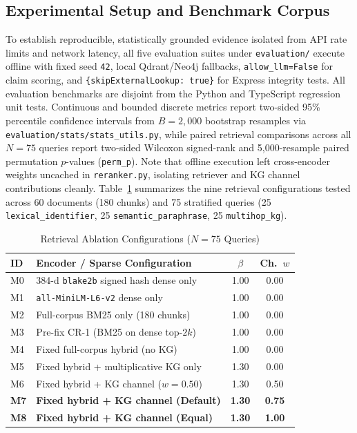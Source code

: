 \documentclass[conference]{IEEEtran}
\begin{document}
\subsection{Experimental Setup and Benchmark Corpus}
To establish reproducible, statistically grounded evidence isolated from API rate limits and network latency, all five evaluation suites under \texttt{evaluation/} execute offline with fixed seed \texttt{42}, local Qdrant/Neo4j fallbacks, \texttt{allow\_llm=False} for claim scoring, and \texttt{\{skipExternalLookup: true\}} for Express integrity tests. All evaluation benchmarks are disjoint from the Python and TypeScript regression unit tests. Continuous and bounded discrete metrics report two-sided 95\% percentile confidence intervals from $B{=}2{,}000$ bootstrap resamples via \texttt{evaluation/stats/stats\_utils.py}, while paired retrieval comparisons across all $N{=}75$ queries report two-sided Wilcoxon signed-rank and 5,000-resample paired permutation $p$-values (\texttt{perm\_p}). Note that offline execution left cross-encoder weights uncached in \texttt{reranker.py}, isolating retriever and KG channel contributions cleanly. Table~\ref{tab:retrieval_configs} summarizes the nine retrieval configurations tested across 60 documents (180 chunks) and 75 stratified queries (25 \texttt{lexical\_identifier}, 25 \texttt{semantic\_paraphrase}, 25 \texttt{multihop\_kg}).

\begin{table}[t]
\centering
\caption{Retrieval Ablation Configurations ($N{=}75$ Queries)}
\label{tab:retrieval_configs}
\footnotesize
\setlength{\tabcolsep}{4pt}
\begin{tabular}{lp{3.7cm}cc}
\toprule
\textbf{ID} & \textbf{Encoder / Sparse Configuration} & $\beta$ & \textbf{Ch.\ $w$} \\
\midrule
M0 & 384-d \texttt{blake2b} signed hash dense only & 1.00 & 0.00 \\
M1 & \texttt{all-MiniLM-L6-v2} dense only & 1.00 & 0.00 \\
M2 & Full-corpus BM25 only (180 chunks) & 1.00 & 0.00 \\
M3 & Pre-fix CR-1 (BM25 on dense top-$2k$) & 1.00 & 0.00 \\
M4 & Fixed full-corpus hybrid (no KG) & 1.00 & 0.00 \\
M5 & Fixed hybrid + multiplicative KG only & 1.30 & 0.00 \\
M6 & Fixed hybrid + KG channel ($w{=}0.50$) & 1.30 & 0.50 \\
\textbf{M7} & \textbf{Fixed hybrid + KG channel (Default)} & \textbf{1.30} & \textbf{0.75} \\
\textbf{M8} & \textbf{Fixed hybrid + KG channel (Equal)} & \textbf{1.30} & \textbf{1.00} \\
\bottomrule
\end{tabular}
\end{table}
\end{document}
